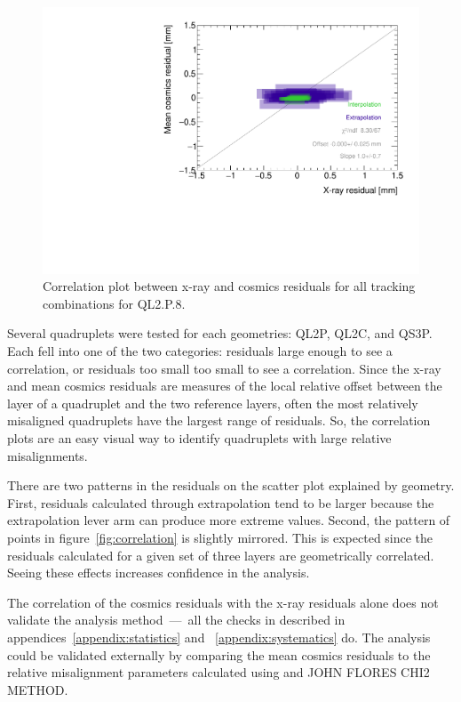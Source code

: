 \begin{figure}
    \centering
    \includegraphics[width = \textwidth]{figures/figure_QL2P08_3100V_2021-08-16_QL2P08_local_cosmic_and_xray_data_correlation_plot.pdf}
    \caption{Correlation plot between x-ray and cosmics residuals for all tracking combinations for QL2.P.8.}
    \label{fig:no_correlation}
\end{figure}

Several quadruplets were tested for each geometries: QL2P, QL2C, and QS3P. Each fell into one of the two categories: residuals large enough to see a correlation, or residuals too small too small to see a correlation. Since the x-ray and mean cosmics residuals are measures of the local relative offset between the layer of a quadruplet and the two reference layers, often the most relatively misaligned quadruplets have the largest range of residuals. So, the correlation plots are an easy visual way to identify quadruplets with large relative misalignments.

There are two patterns in the residuals on the scatter plot explained by geometry. First, residuals calculated through extrapolation tend to be larger because the extrapolation lever arm can produce more extreme values. Second, the pattern of points in figure~\ref{fig:correlation} is slightly mirrored. This is expected since the residuals calculated for a given set of three layers are geometrically correlated. Seeing these effects increases confidence in the analysis. 

The correlation of the cosmics residuals with the x-ray residuals alone does not validate the analysis method~---~all the checks in described in appendices~\ref{appendix:statistics} and ~\ref{appendix:systematics} do. The analysis could be validated externally by comparing the mean cosmics residuals to the relative misalignment parameters calculated using  and JOHN FLORES CHI2 METHOD.

